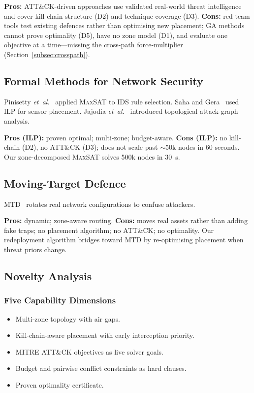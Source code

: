 \documentclass[journal]{IEEEtran}
\newcommand{\etal}{\emph{et~al.}}
\newcommand{\maxsat}{\textsc{MaxSAT}}
\begin{document}
\textbf{Pros:} ATT\&CK-driven approaches use validated
real-world threat intelligence and cover kill-chain structure
(D2) and technique coverage (D3).
\textbf{Cons:} red-team tools test existing defences rather
than optimising new placement; GA methods cannot prove
optimality (D5), have no zone model (D1), and evaluate one
objective at a time---missing the cross-path force-multiplier
(Section~\ref{subsec:crosspath}).

\subsection{Formal Methods for Network Security}

Pinisetty \etal{}~\cite{pinisetty2017} applied \maxsat{} to
IDS rule selection.
Saha and Gera~\cite{saha2015} used ILP for sensor placement.
Jajodia \etal{}~\cite{jajodia2005} introduced topological
attack-graph analysis.

\textbf{Pros (ILP):} proven optimal; multi-zone; budget-aware.
\textbf{Cons (ILP):} no kill-chain (D2), no ATT\&CK (D3);
does not scale past $\sim$50k nodes in 60 seconds.
Our zone-decomposed \maxsat{} solves 500k nodes in 30~s.

\subsection{Moving-Target Defence}

MTD~\cite{zhu2013} rotates real network configurations to
confuse attackers.

\textbf{Pros:} dynamic; zone-aware routing.
\textbf{Cons:} moves real assets rather than adding fake
traps; no placement algorithm; no ATT\&CK; no optimality.
Our redeployment algorithm bridges toward MTD by
re-optimising placement when threat priors change.

\subsection{Novelty Analysis}
\label{subsec:novelty}

\subsubsection{Five Capability Dimensions}

\begin{itemize}
  \item[\textbf{D1}] Multi-zone topology with air gaps.
  \item[\textbf{D2}] Kill-chain-aware placement with early
        interception priority.
  \item[\textbf{D3}] MITRE ATT\&CK objectives as live solver
        goals.
  \item[\textbf{D4}] Budget and pairwise conflict constraints
        as hard clauses.
  \item[\textbf{D5}] Proven optimality certificate.
\end{itemize}
\end{document}
